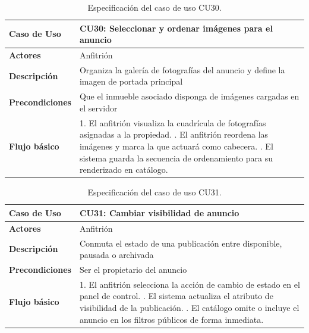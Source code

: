 \begin{table}[H]
\centering
\begin{tabular}{|p{3.1cm}|p{10.9cm}|}
\hline
\textbf{Caso de Uso} & \textbf{CU30: Seleccionar y ordenar imágenes para el anuncio} \\ \hline
\textbf{Actores} & Anfitrión \\ \hline
\textbf{Descripción} & Organiza la galería de fotografías del anuncio y define la imagen de portada principal \\ \hline
\textbf{Precondiciones} & Que el inmueble asociado disponga de imágenes cargadas en el servidor \\ \hline
\textbf{Flujo básico} & 
1. El anfitrión visualiza la cuadrícula de fotografías asignadas a la propiedad. \newline
2. El anfitrión reordena las imágenes y marca la que actuará como cabecera. \newline
3. El sistema guarda la secuencia de ordenamiento para su renderizado en catálogo. \\ \hline
\end{tabular}
\caption{Especificación del caso de uso CU30.}
\label{tab:cu30}
\end{table}

\begin{table}[H]
\centering
\begin{tabular}{|p{3.1cm}|p{10.9cm}|}
\hline
\textbf{Caso de Uso} & \textbf{CU31: Cambiar visibilidad de anuncio} \\ \hline
\textbf{Actores} & Anfitrión \\ \hline
\textbf{Descripción} & Conmuta el estado de una publicación entre disponible, pausada o archivada \\ \hline
\textbf{Precondiciones} & Ser el propietario del anuncio \\ \hline
\textbf{Flujo básico} & 
1. El anfitrión selecciona la acción de cambio de estado en el panel de control. \newline
2. El sistema actualiza el atributo de visibilidad de la publicación. \newline
3. El catálogo omite o incluye el anuncio en los filtros públicos de forma inmediata. \\ \hline
\end{tabular}
\caption{Especificación del caso de uso CU31.}
\label{tab:cu31}
\end{table}